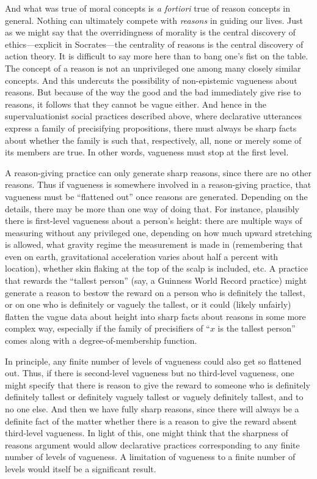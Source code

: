 And what was true of moral concepts is \textit{a fortiori} true of reason concepts in general. Nothing can ultimately compete with \textit{reasons} in
guiding our lives. Just as we might say that the overridingness of morality is the central discovery of ethics---explicit in Socrates---the 
centrality of reasons is the central discovery of action theory. It is difficult to say more here than to bang one's fist on the table. 
The concept of a reason is not an unprivileged one among many closely similar concepts. And this undercuts the possibility of 
non-epistemic vagueness about reasons. But because of the way the good and the bad immediately give rise to reasons, it follows that
they cannot be vague either. And hence in the supervaluationist social practices described above, where declarative utterances express a 
family of precisifying propositions, there must always be sharp facts about whether the family is such that, respectively, all, none or merely some of its
members are true. In other words, vagueness must stop at the first level.

A reason-giving practice can only generate sharp reasons, since there are no other reasons. Thus if vagueness is somewhere involved in a 
reason-giving practice, that vagueness must be ``flattened out'' once reasons are generated. Depending on the details, there may be
more than one way of doing that. For instance, plausibly there is first-level vagueness about a person's height: there are multiple 
ways of measuring without any privileged one, depending on how much upward stretching is allowed, what gravity regime the measurement 
is made in (remembering that even on earth, gravitational acceleration varies about half a percent with location), whether skin flaking 
at the top of the scalp is included, etc.  A practice that rewards the ``tallest person'' (say, a Guinness World Record practice) might
generate a reason to bestow the reward on a person who is definitely the tallest, or on one who is definitely or vaguely the tallest, or
it could (likely unfairly) flatten the vague data about height into sharp facts about reasons in some more complex way, especially if
the family of precisifiers of ``$x$ is the tallest person'' comes along with a degree-of-membership function. 

In principle, any finite number of levels of vagueness could also get so flattened out. Thus, if there is second-level vagueness but no third-level
vagueness, one might specify that there is reason to give the reward to someone who is definitely definitely tallest or 
definitely vaguely tallest or vaguely definitely tallest, and to no one else. And then we have fully sharp reasons, since there will 
always be a definite fact of the matter whether there is a reason to give the reward absent third-level vagueness. In light of this,
one might think that the sharpness of reasons argument would allow declarative practices corresponding to any finite number of levels
of vagueness. A limitation of vagueness to a finite number of levels would itself be a significant result. 

